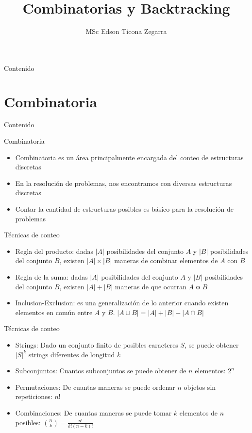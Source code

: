 \documentclass[handout]{beamer}
\title{Combinatorias y Backtracking}
\author{MSc Edson Ticona Zegarra}
\institute{Campamento de Programaci\'on}
\date{}
\begin{document}
\maketitle

\begin{frame}{Contenido}
\tableofcontents
\end{frame}

\section{Combinatoria}
\begin{frame}{Contenido}
\tableofcontents[currentsection]
\end{frame}

\begin{frame}{Combinatoria}
 \begin{itemize}
    \item Combinatoria es un \'area principalmente encargada del conteo de estructuras discretas
      \pause
    \item En la resoluci\'on de problemas, nos encontramos con diversas estructuras discretas
      \pause
    \item Contar la cantidad de estructuras posibles es b\'asico para la resoluci\'on de problemas
  \end{itemize}
\end{frame}

\begin{frame}{T\'ecnicas de conteo}
  \begin{itemize}
    \item Regla del producto: dadas $|A|$ posibilidades del conjunto $A$ y $|B|$ posibilidades del conjunto $B$, existen $|A|\times |B|$ maneras de combinar elementos de $A$ con $B$
      \pause
    \item Regla de la suma: dadas $|A|$ posibilidades del conjunto $A$ y $|B|$ posibilidades del conjunto $B$, existen $|A| + |B|$ maneras de que ocurran $A$ \textbf{o} $B$
      \pause
    \item Inclusion-Exclusion: es una generalizaci\'on de lo anterior cuando existen elementos en com\'un entre $A$ y $B$. $|A\cup B| = |A| + |B| - |A\cap B|$
  \end{itemize}
\end{frame}

\begin{frame}{T\'ecnicas de conteo}
  \begin{itemize}
    \item Strings: Dado un conjunto finito de posibles caracteres $S$, se puede obtener $|S|^k$ strings diferentes de longitud $k$
      \pause
    \item Subconjuntos: Cuantos subconjuntos se puede obtener de $n$ elementos: $2^n$
      \pause
    \item Permutaciones: De cuantas maneras se puede ordenar $n$ objetos sin repeticiones: $n!$
      \pause
    \item Combinaciones: De cuantas maneras se puede tomar $k$ elementos de $n$ posibles: $\binom{n}{k} = \frac{n!}{k!(n-k)!}$
  \end{itemize}
\end{frame}
\end{document}
